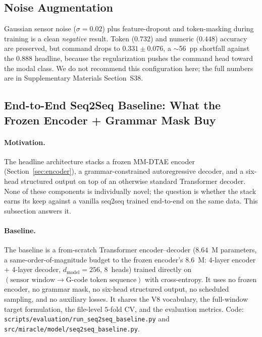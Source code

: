 \documentclass[sensors,article,submit,moreauthors,pdftex]{Definitions/mdpi}
\begin{document}
\subsection{Noise Augmentation}
\label{sec:noise-aug}

Gaussian sensor noise ($\sigma=0.02$) plus feature-dropout and token-masking during training is a clean \emph{negative} result. Token ($0.732$) and numeric ($0.448$) accuracy are preserved, but command drops to $0.331 \pm 0.076$, a $\sim$56~pp shortfall against the $0.888$ headline, because the regularization pushes the command head toward the modal class. We do not recommend this configuration here; the full numbers are in Supplementary Materials Section~S38.

\subsection{End-to-End Seq2Seq Baseline: What the Frozen Encoder + Grammar Mask Buy}
\label{sec:abl-seq2seq-baseline}

\paragraph{Motivation.} The headline architecture stacks a frozen MM-DTAE encoder (Section~\ref{sec:encoder}), a grammar-constrained autoregressive decoder, and a six-head structured output on top of an otherwise standard Transformer decoder. None of these components is individually novel; the question is whether the stack earns its keep against a vanilla seq2seq trained end-to-end on the same data. This subsection answers it.

\paragraph{Baseline.} The baseline is a from-scratch Transformer encoder--decoder ($8.64$~M parameters, a same-order-of-magnitude budget to the frozen encoder's $8.6$~M: 4-layer encoder + 4-layer decoder, $d_{\text{model}}\!=\!256$, $8$~heads) trained directly on $(\text{sensor window}\!\to\!\text{G-code token sequence})$ with cross-entropy. It uses no frozen encoder, no grammar mask, no six-head structured output, no scheduled sampling, and no auxiliary losses. It shares the V8 vocabulary, the full-window target formulation, the file-level $5$-fold CV, and the evaluation metrics. Code: \texttt{scripts/evaluation/run\_seq2seq\_baseline.py} and \texttt{src/miracle/model/seq2seq\_baseline.py}.
\end{document}
